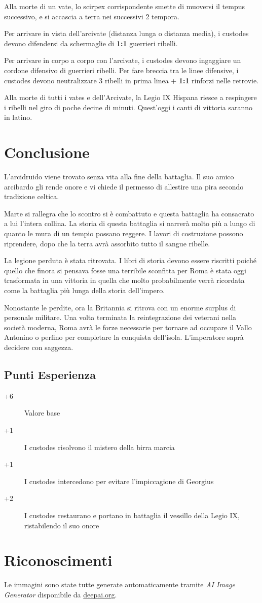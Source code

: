 \documentclass[11.5pt,twocolumn]{article}
\begin{document}
Alla morte di un vate, lo scirpex corrispondente smette di muoversi il tempus successivo, e si accascia a terra nei successivi 2 tempora.

Per arrivare in vista dell'arcivate (distanza lunga o distanza media), i custodes devono difendersi da schermaglie di \textbf{1:1} guerrieri ribelli.

Per arrivare in corpo a corpo con l'arcivate, i custodes devono ingaggiare un cordone difensivo di guerrieri ribelli. Per fare breccia tra le linee difensive, i custodes devono neutralizzare 3 ribelli in prima linea + \textbf{1:1} rinforzi nelle retrovie.

Alla morte di tutti i vates e dell'Arcivate, la Legio IX Hispana riesce a respingere i ribelli nel giro di poche decine di minuti.
Quest'oggi i canti di vittoria saranno in latino.

\section*{Conclusione}
%
L'arcidruido viene trovato senza vita alla fine della battaglia.
Il suo amico arcibardo gli rende onore e vi chiede il permesso di allestire una pira secondo tradizione celtica.

Marte si rallegra che lo scontro si \`{e} combattuto e questa battaglia ha consacrato a lui l'intera collina.
La storia di questa battaglia si narrer\`{a} molto pi\`{u} a lungo di quanto le mura di un tempio possano reggere.
I lavori di costruzione possono riprendere, dopo che la terra avr\`{a} assorbito tutto il sangue ribelle.

La legione perduta \`{e} stata ritrovata.
I libri di storia devono essere riscritti poich\'{e} quello che finora si pensava fosse una terribile sconfitta per Roma \`{e} stata oggi trasformata in una vittoria in quella che molto probabilmente verr\`{a} ricordata come la battaglia pi\`{u} lunga della storia dell'impero.

Nonostante le perdite, ora la Britannia si ritrova con un enorme surplus di personale militare.
Una volta terminata la reintegrazione dei veterani nella societ\`{a} moderna, Roma avr\`{a} le forze necessarie per tornare ad occupare il Vallo Antonino o perfino per completare la conquista dell'isola.
L'imperatore sapr\`{a} decidere con saggezza.

\subsection*{Punti Esperienza}
\begin{description}
\item[+6] Valore base
\item[+1] I custodes risolvono il mistero della birra marcia
\item[+1] I custodes intercedono per evitare l'impiccagione di Georgius
\item[+2] I custodes restaurano e portano in battaglia il vessillo della Legio IX, ristabilendo il suo onore
\end{description}

\section*{Riconoscimenti}
Le immagini sono state tutte generate automaticamente tramite \emph{AI Image Generator} disponibile da \url{deepai.org}.



\end{document}
